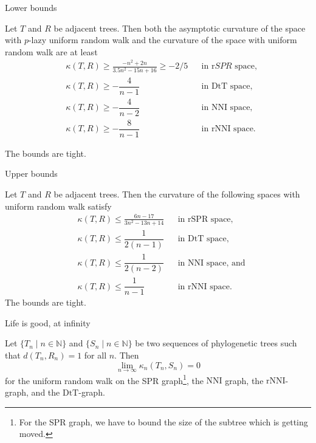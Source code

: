 \documentclass{beamer}
\newcommand{\nni}{\mathrm{NNI}}
\newcommand{\rnni}{\mathrm{rNNI}}
\newcommand{\mdts}{\mathrm{DtT}}
\theoremstyle{example}
\begin{document}
\begin{frame}{Lower bounds}
\begin{theorem}
Let $T$ and $R$ be adjacent trees.
Then both the asymptotic curvature of the space with $p$-lazy uniform random walk and the curvature of the space with uniform random walk are at least 
\begin{align*}
& \kappa(T,R) \geq \frac{-n^2 + 2n}{3.5n^2 - 15n + 16} \geq -2/5	&& \mbox{in $\mathrm rSPR$ space,}\\
& \kappa(T,R) \geq -\dfrac{4}{n-1}							&& \mbox{in $\mdts$ space,}\\
& \kappa(T,R) \geq -\dfrac{4}{n-2}							&& \mbox{in $\nni$ space,}\\
& \kappa(T,R) \geq -\dfrac{8}{n-1}							&& \mbox{in $\rnni$ space.}
\end{align*}

The bounds are tight.
\end{theorem}
\end{frame}

\begin{frame}{Upper bounds}
\begin{theorem}
Let $T$ and $R$ be adjacent trees.
Then the curvature of the following spaces with uniform random walk satisfy
\begin{align*}
& \kappa(T,R) \leq \frac{6n-17}{3n^2-13n+14}	&& \mbox{in $\mathrm{rSPR}$ space,}\\
& \kappa(T,R) \leq \dfrac{1}{2(n-1)}			&& \mbox{in $\mdts$ space,}\\
& \kappa(T,R) \leq \dfrac{1}{2(n-2)}			&& \mbox{in $\nni$ space, and}\\
& \kappa(T,R) \leq \dfrac{1}{n-1}				&& \mbox{in $\rnni$ space.}
\end{align*}
The bounds are tight.
\end{theorem}
\end{frame}

\begin{frame}{Life is good, at infinity}
\begin{theorem}
Let $\{T_n \mid n \in \mathbb N\}$ and $\{S_n \mid n \in \mathbb N\}$ be two sequences of phylogenetic trees such that $d(T_n,R_n) = 1$ for all $n$.
Then $$\lim_{n \rightarrow \infty} \kappa_n(T_n,S_n) = 0$$ for the uniform random walk on the SPR
graph\footnote{For the SPR graph, we have to bound the size of the subtree which is getting moved.},
the $\nni$ graph, the $\rnni$-graph, and the $\mdts$-graph.
\end{theorem}
\end{frame}
\end{document}
